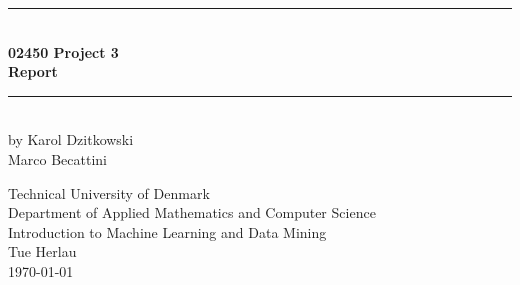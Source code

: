 \begin{titlingpage}
\centering \parindent=0pt
\newcommand{\HRule}{\rule{\textwidth}{1mm}}
 \HRule\\[1cm]\Huge\bfseries
02450 Project 3\\[0.7cm]
\large Report\\[1cm]
\HRule\\[4cm]  
\large by Karol Dzitkowski\\
Marco Becattini\\
 \normalsize %
\begin{flushleft}
Technical University of Denmark\\
Department of Applied Mathematics and Computer Science\\
Introduction to Machine Learning and Data Mining\\
Tue Herlau\\
\today \end{flushleft}
\end{titlingpage}
